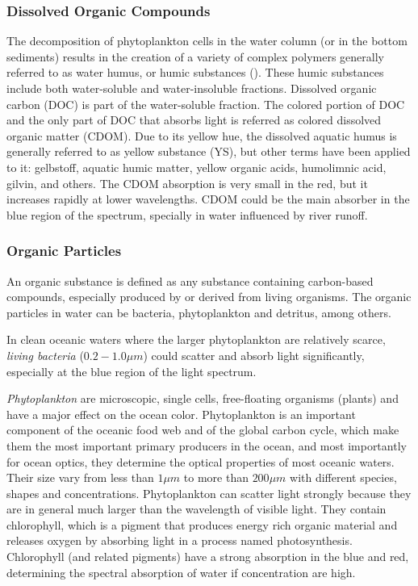 \subsubsection*{Dissolved Organic Compounds}
The decomposition of phytoplankton cells in the water column (or in the bottom sediments) results in the creation of a variety of complex polymers generally referred to as water humus, or humic substances (\cite{Bukata1995}). These humic substances include both water-soluble and water-insoluble fractions. Dissolved organic carbon (DOC) is part of the water-soluble fraction.  The colored portion of DOC and the only part of DOC that absorbs light is referred as colored dissolved organic matter (CDOM). Due to its yellow hue, the dissolved aquatic humus is generally referred to as yellow substance (YS), but other terms have been applied to it: gelbstoff, aquatic humic matter, yellow organic acids, humolimnic acid, gilvin, and others. The CDOM absorption is very small in the red, but it increases rapidly at lower wavelengths. CDOM could be the main absorber in the blue region of the spectrum, specially in water influenced by river runoff.
\subsubsection*{Organic Particles}
An organic substance is defined as any substance containing carbon-based compounds, especially produced by or derived from living organisms. The organic particles in water can be bacteria, phytoplankton and detritus, among others.

In clean oceanic waters where the larger phytoplankton are relatively scarce, {\it living bacteria} ($0.2-1.0\mu m$) could scatter and absorb light significantly, especially at the blue region of the light spectrum.

{\it Phytoplankton} are microscopic, single cells, free-floating organisms (plants) and have a major effect on the ocean color. Phytoplankton is an important component of the oceanic food web and of the global carbon cycle, which make them the most important primary producers in the ocean, and most importantly for ocean optics, they determine the optical properties of most oceanic waters. Their size vary from less than $1\mu m$ to more than $200\mu m$ with different species, shapes and concentrations. Phytoplankton can scatter light strongly because they are in general much larger than the wavelength of visible light. They contain chlorophyll, which is a pigment that produces energy rich organic material and releases oxygen by absorbing light in a process named photosynthesis. Chlorophyll (and related pigments) have a strong absorption in the blue and red, determining the spectral absorption of water if concentration are high.

